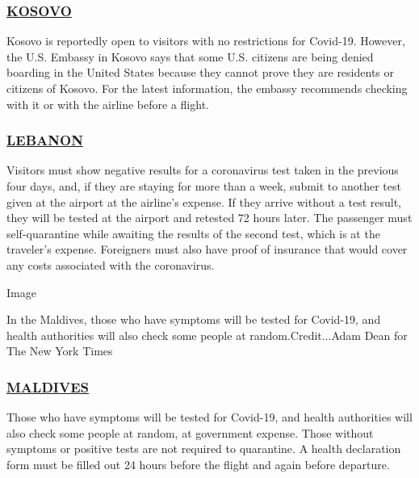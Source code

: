 \hypertarget{kosovo}{%
\subsubsection{\texorpdfstring{\href{https://xk.usembassy.gov/coronavirus/}{KOSOVO}}{KOSOVO}}\label{kosovo}}

Kosovo is reportedly open to visitors with no restrictions for Covid-19.
However, the U.S. Embassy in Kosovo says that some U.S. citizens are
being denied boarding in the United States because they cannot prove
they are residents or citizens of Kosovo. For the latest information,
the embassy recommends checking with it or with the airline before a
flight.

\hypertarget{lebanon}{%
\subsubsection{\texorpdfstring{\href{https://lb.usembassy.gov/covid-19-information/}{LEBANON}}{LEBANON}}\label{lebanon}}

Visitors must show negative results for a coronavirus test taken in the
previous four days, and, if they are staying for more than a week,
submit to another test given at the airport at the airline's expense. If
they arrive without a test result, they will be tested at the airport
and retested 72 hours later. The passenger must self-quarantine while
awaiting the results of the second test, which is at the traveler's
expense. Foreigners must also have proof of insurance that would cover
any costs associated with the coronavirus.

Image

In the Maldives, those who have symptoms will be tested for Covid-19,
and health authorities will also check some people at
random.Credit...Adam Dean for The New York Times

\hypertarget{maldives}{%
\subsubsection{\texorpdfstring{\href{https://visitmaldives.com/en/covid19-updates}{MALDIVES}}{MALDIVES}}\label{maldives}}

Those who have symptoms will be tested for Covid-19, and health
authorities will also check some people at random, at government
expense. Those without symptoms or positive tests are not required to
quarantine. A health declaration form must be filled out 24 hours before
the flight and again before departure.

